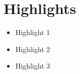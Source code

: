 
\section*{Highlights}
\begin{itemize}
    \item Highlight 1
    \item Highlight 2
    \item Highlight 3
\end{itemize}